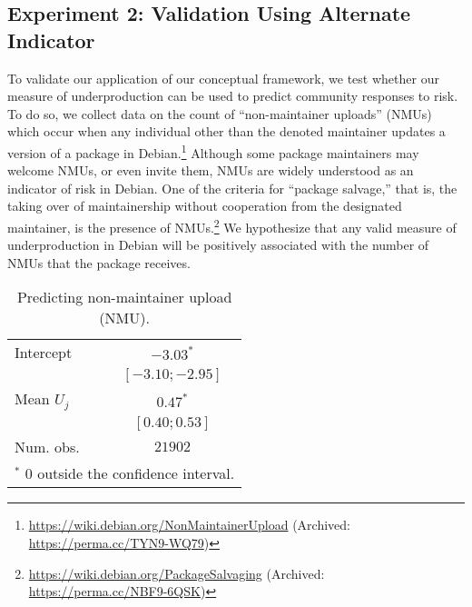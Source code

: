 \documentclass[10pt,conference]{IEEEtran}\usepackage[]{graphicx}\usepackage[usenames,dvipsnames]{color}
\begin{document}
\subsection{Experiment 2: Validation Using Alternate Indicator}
\label{sec:validation}

To validate our application of our conceptual framework, we test whether our measure of underproduction can be used to predict community responses to risk.
To do so, we collect data on the count of ``non-maintainer uploads'' (NMUs) which occur when any individual other than the denoted maintainer updates a version of a package in Debian.\footnote{\url{https://wiki.debian.org/NonMaintainerUpload} (Archived: \url{https://perma.cc/TYN9-WQ79})} 
Although some package maintainers may welcome NMUs, or even invite them, NMUs are widely understood as an indicator of risk in Debian. One of the criteria for ``package salvage,'' that is, the taking over of maintainership without cooperation from the designated maintainer, is the presence of NMUs.\footnote{\url{https://wiki.debian.org/PackageSalvaging} (Archived: \url{https://perma.cc/NBF9-6QSK})} We hypothesize that any valid measure of underproduction in Debian will be positively associated with the number of NMUs that the package receives.


\begin{table}
\begin{center}
\caption{Predicting non-maintainer upload (NMU). \label{tab:validityModels}}
 \begin{tabular}{l c} \hline Intercept      & $-3.03^{*}$       \\                & $ [-3.10; -2.95]$ \\ Mean $U_j$     & $0.47^{*}$        \\                & $ [ 0.40;  0.53]$ \\ \hline Num. obs.      & $21902$           \\ \hline \multicolumn{2}{l}{\scriptsize{$^*$ 0 outside the confidence interval.}} \end{tabular}
\end{center}
\end{table}
\end{document}
